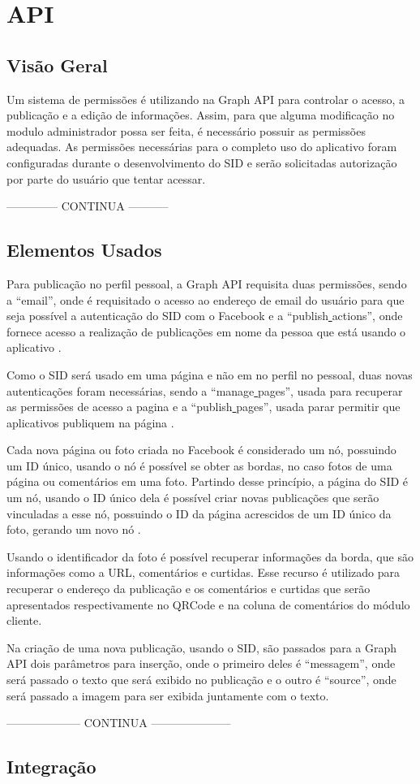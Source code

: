 \chapter[API]{API}
\section{Visão Geral}
Um sistema de permissões é utilizando na Graph API para controlar o acesso, a publicação e a edição de informações. Assim, para que alguma modificação no modulo administrador
possa ser feita, é necessário possuir as permissões adequadas. As permissões necessárias para o completo uso do aplicativo foram configuradas durante o desenvolvimento do SID e serão solicitadas autorização por parte do usuário que tentar acessar.

-------------- CONTINUA -----------

\section{Elementos Usados}
Para publicação no perfil pessoal, a Graph API requisita duas permissões, sendo a “email”, onde é requisitado o acesso ao endereço de email do usuário para que seja possível a autenticação do SID com o Facebook e a “publish\underline{{ }}actions”, onde fornece acesso a realização de publicações em nome da pessoa que está usando o aplicativo \cite{facebook2018a}.

Como o SID será usado em uma página e não em no perfil no pessoal, duas novas autenticações foram necessárias, sendo a “manage\underline{{ }}pages”, usada para recuperar as permissões de acesso a pagina e a “publish\underline{{ }}pages”, usada parar permitir que aplicativos publiquem na página \cite{facebook2018a}.

Cada nova página ou foto criada no Facebook é considerado um nó, possuindo um ID único, usando o nó é possível se obter as bordas, no caso fotos de uma página ou comentários em uma foto. Partindo desse princípio, a página do SID é um nó, usando o ID único dela é possível criar novas publicações que serão vinculadas a esse nó, possuindo o ID da página acrescidos de um ID único da foto, gerando um novo nó \cite{facebook2018b}.

Usando o identificador da foto é possível recuperar informações da borda, que são informações como a URL, comentários e curtidas. Esse recurso é utilizado para recuperar o endereço da publicação e os comentários e curtidas que serão apresentados respectivamente no QRCode e na coluna de comentários do módulo cliente.

Na criação de uma nova publicação, usando o SID, são passados para a Graph API dois parâmetros para inserção, onde o primeiro deles é “messagem”, onde será passado o texto que será exibido no publicação e o outro é “source”, onde será passado a imagem para ser exibida juntamente com o texto.

——————– CONTINUA ———————



\section{Integração}